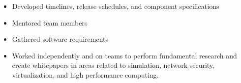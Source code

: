 \documentclass[margin,line]{resume}
\begin{document}
\begin{resume}
\begin{itemize}
\item Developed timelines, release schedules, and component specifications
\item Mentored team members
\item Gathered software requirements
\item Worked independently and on teams to perform fundamental research and
      create whitepapers in areas related to simulation, network security,
      virtualization, and high performance computing.
\end{itemize}


\end{resume}
\end{document}
